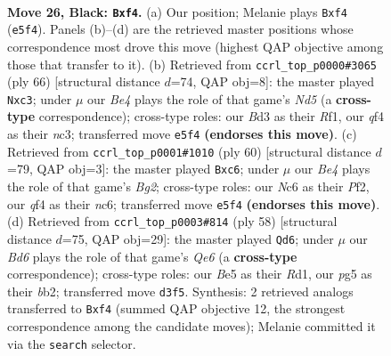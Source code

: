 \documentclass[11pt]{article}
\begin{document}
\clearpage

\begin{figure}[p]\centering
\begin{subfigure}{0.46\textwidth}\centering
\resizebox{\linewidth}{!}{%
\newchessgame
\chessboard[
  setfen={r3k3/pp6/2n3p1/4b1P1/5Q2/3b4/3B4/1R2K1N1 b q - 1 26},
  showmover=false,
  pgfstyle=straightmove, color=movearrow, markmove={e5-f4}
]}
\caption{}
\end{subfigure}\hfill
\begin{subfigure}{0.46\textwidth}\centering
\resizebox{\linewidth}{!}{%
\newchessgame
\chessboard[
  setfen={5k2/6bp/3p4/3N4/2B2P2/2n2K2/3r3P/5R2 w - - 0 34},
  showmover=false,
  pgfstyle=straightmove, color=movearrow, markmove={d5-c3}
]}
\caption{}
\end{subfigure}
\\[4pt]
\begin{subfigure}{0.46\textwidth}\centering
\resizebox{\linewidth}{!}{%
\newchessgame
\chessboard[
  setfen={4r1k1/p5p1/2n1b2p/8/8/B5PP/n4PB1/3R2K1 w - - 0 31},
  showmover=false,
  pgfstyle=straightmove, color=movearrow, markmove={g2-c6}
]}
\caption{}
\end{subfigure}\hfill
\begin{subfigure}{0.46\textwidth}\centering
\resizebox{\linewidth}{!}{%
\newchessgame
\chessboard[
  setfen={5r1k/pB5p/4Q1p1/2P5/8/8/1b1q2PP/3R3K w - - 1 30},
  showmover=false,
  pgfstyle=straightmove, color=movearrow, markmove={e6-d6}
]}
\caption{}
\end{subfigure}
\caption{\textbf{Move 26, Black: \texttt{Bxf4}.} (a) Our position; Melanie plays \texttt{Bxf4} (\texttt{e5f4}). Panels (b)--(d) are the retrieved master positions whose correspondence most drove this move (highest QAP objective among those that transfer to it). (b) Retrieved from \texttt{ccrl\_top\_p0000\#3065} (ply 66) [structural distance $d$=74, QAP obj=8]: the master played \texttt{Nxc3}; under $\mu$ our \emph{Be4} plays the role of that game's \emph{Nd5} (a \textbf{cross-type} correspondence); cross-type roles: our \emph{B}d3 as their \emph{R}f1, our \emph{q}f4 as their \emph{n}c3; transferred move \texttt{e5f4} \textbf{(endorses this move)}. (c) Retrieved from \texttt{ccrl\_top\_p0001\#1010} (ply 60) [structural distance $d$=79, QAP obj=3]: the master played \texttt{Bxc6}; under $\mu$ our \emph{Be4} plays the role of that game's \emph{Bg2}; cross-type roles: our \emph{N}c6 as their \emph{P}f2, our \emph{q}f4 as their \emph{n}c6; transferred move \texttt{e5f4} \textbf{(endorses this move)}. (d) Retrieved from \texttt{ccrl\_top\_p0003\#814} (ply 58) [structural distance $d$=75, QAP obj=29]: the master played \texttt{Qd6}; under $\mu$ our \emph{Bd6} plays the role of that game's \emph{Qe6} (a \textbf{cross-type} correspondence); cross-type roles: our \emph{B}e5 as their \emph{R}d1, our \emph{p}g5 as their \emph{b}b2; transferred move \texttt{d3f5}. Synthesis: 2 retrieved analogs transferred to \texttt{Bxf4} (summed QAP objective 12, the strongest correspondence among the candidate moves); Melanie committed it via the \texttt{search} selector.}
\label{fig:thought-m51}
\end{figure}
\end{document}
